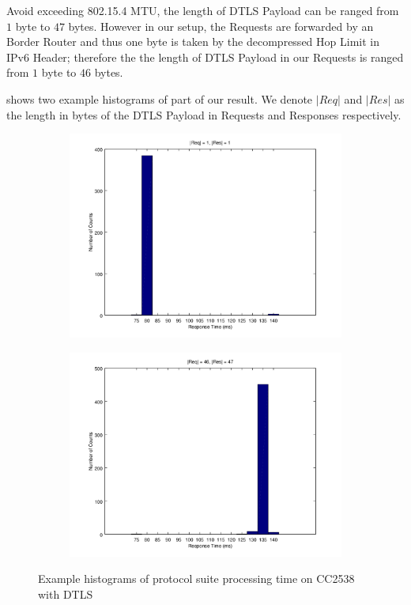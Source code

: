 Avoid exceeding 802.15.4 MTU, the length of DTLS Payload can be ranged from $1$ byte to $47$ bytes. However in our setup, the Requests are forwarded by an Border Router and thus one byte is taken by the decompressed Hop Limit in IPv6 Header; therefore the the length of DTLS Payload in our Requests is ranged from $1$ byte to $46$ bytes.

 shows two example histograms of part of our result. We denote $|Req|$ and $|Res|$ as the length in bytes of the DTLS Payload in Requests and Responses respectively.

\begin{figure}[ht!]
	\center
	\begin{subfigure}{.45\textwidth}
	\center
	\includegraphics[width=\linewidth]{fig/dtlstimehist_min.png}
	\end{subfigure}
	\begin{subfigure}{.45\textwidth}
	\center
	\includegraphics[width=\linewidth]{fig/dtlstimehist_max.png}
	\end{subfigure}
	\caption{Example histograms of protocol suite processing time on CC2538 with DTLS}
	\label{Fig: Example histograms of protocol suite processing time on CC2538 with DTLS}
\end{figure}

